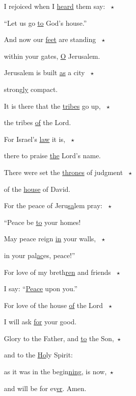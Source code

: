 \noindent I rejoiced when I \uline{heard} them say: ~$\star$~\nopagebreak

“Let us go \uline{to} God’s house.”

\noindent And now our \uline{feet} are standing ~$\star$~\nopagebreak

within your gates, \uline{O} Jerusalem.

\noindent Jerusalem is built \uline{as} a city ~$\star$~\nopagebreak

strong\uline{ly} compact.

\noindent It is there that the \uline{tribes} go up, ~$\star$~\nopagebreak

the tribes \uline{of} the Lord.

\noindent For Israel’s \uline{law} it is, ~$\star$~\nopagebreak

there to praise \uline{the} Lord’s name.

\noindent There were set the \uline{thrones} of judgment ~$\star$~\nopagebreak

of the \uline{house} of David.

\noindent For the peace of Jeru\uline{sa}lem pray: ~$\star$~\nopagebreak

“Peace be \uline{to} your homes!

\noindent May peace reign \uline{in} your walls, ~$\star$~\nopagebreak

in your pal\uline{ac}es, peace!”

\noindent For love of my breth\uline{ren} and friends ~$\star$~\nopagebreak

I say: “\uline{Peace} upon you.”

\noindent For love of the house \uline{of} the Lord ~$\star$~\nopagebreak

I will ask \uline{for} your good.

\noindent Glory to the Father, and \uline{to} the Son,~$\star$~\nopagebreak

and to the \uline{Ho}ly Spirit:

\noindent as it was in the begin\uline{ning}, is now,~$\star$~\nopagebreak

and will be for ev\uline{er}. Amen.
